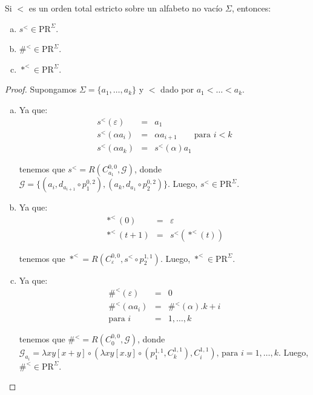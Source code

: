  \begin{lemma}
    \PN Si $<$ es un orden total estricto sobre un alfabeto no vacío $\Sigma$, entonces:

    \begin{enumerate}[a)]
      \item $s^{<} \in \mathrm{PR}^{\Sigma}$.
      \item $\#^{<} \in \mathrm{PR}^{\Sigma}$.
      \item $\ast^{<} \in \mathrm{PR}^{\Sigma}$.
    \end{enumerate}
  \end{lemma}
  \begin{proof}
    \PN Supongamos $\Sigma = \{a_{1}, \dotsc, a_{k}\}$ y $<$ dado por $a_{1} < \dotsc < a_{k}$.

    \begin{enumerate}[a)]
      \item Ya que:
        \begin{eqnarray*}
          s^{<}(\varepsilon) &=& a_{1} \\
          s^{<}(\alpha a_{i}) &=& \alpha a_{i+1} \qquad \text{para } i < k \\
          s^{<}(\alpha a_{k}) &=& s^{<}(\alpha) a_{1}
        \end{eqnarray*}

        \PN tenemos que $s^{<} = R(C_{a_{1}}^{0, 0}, \mathcal{G})$, donde $\mathcal{G} = \{\left(a_{i}, d_{a_{i+1}}
        \circ p_{1}^{0,2} \right), \left(a_{k}, d_{a_{1}} \circ p_{2}^{0,2} \right)\}$.
        \PN Luego, $s^{<} \in \mathrm{PR}^{\Sigma}$.

      \item Ya que:
        \begin{eqnarray*}
          \ast^{<}(0) &=& \varepsilon \\
          \ast^{<}(t+1) &=& s^{<}(\ast^{<}(t))
        \end{eqnarray*}

        \PN tenemos que $\ast^{<} = R(C_{\varepsilon}^{0,0}, s^{<} \circ p_{2}^{1,1})$. Luego, $\ast^{<} \in
        \mathrm{PR}^{\Sigma}$.

      \item Ya que:
        \begin{eqnarray*}
          \#^{<}(\varepsilon) &=& 0 \\
          \#^{<}(\alpha a_{i}) &=& \#^{<}(\alpha). k + i \\
          \text{para } i &=& 1, \dotsc, k
        \end{eqnarray*}

        \PN tenemos que $\#^{<} = R(C_{0}^{0, 0}, \mathcal{G})$, donde $\mathcal{G}_{a_{i}} = \lambda xy
        \left[x+y\right] \circ (\lambda xy \left[x.y\right] \circ (p_{1}^{1, 1}, C_{k}^{1, 1}), C_{i}^{1, 1})
        \text{, para } i = 1, \dotsc, k$. Luego, $\#^{<} \in \mathrm{PR}^{\Sigma}$.
    \end{enumerate}
  \end{proof}

